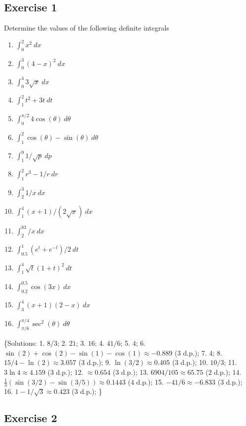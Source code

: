 \documentclass[
  11pt,
  oneside]{book}
\providecommand{\tightlist}{%
  \setlength{\itemsep}{0pt}\setlength{\parskip}{0pt}}
\newcommand{\slide}{}
\theoremstyle{definition}
\theoremstyle{definition}
\theoremstyle{definition}
\theoremstyle{definition}
\theoremstyle{remark}
\begin{document}
\subsection*{Exercise 1}\label{exercise-1-6}

Determine the values of the following definite integrals

\begin{enumerate}
\def\labelenumi{\arabic{enumi}.}
\tightlist
\item
  \(\int_0^2 x^2\ dx\)
\item
  \(\int_0^3 (4-x)^2\ dx\)
\item
  \(\int_0^4 3\sqrt{x}\ dx\)
\item
  \(\int_1^2 t^2+3t\ dt\)
\item
  \(\int_0^{\pi/2}4\cos(\theta) \ d\theta\)
\item
  \(\int_1^2 \cos(\theta)-\sin(\theta)\ d\theta\)
\item
  \(\int_1^9 1/\sqrt{p}\ dp\)
\item
  \(\int_1^2 r^3-1/r\ dr\)
\item
  \(\int_2^3 1/x\ dx\)
\item
  \(\int_1^4 (x+1)/(2\sqrt{x})\ dx\)
\item
  \(\int_2^83/x \ dx\)
\item
  \(\int_{0.5}^1(e^t+e^{-t})/2 \ dt\)
\item
  \(\int_1^4 \sqrt{t}(1+t)^2 \ dt\)
\item
  \(\int_{0.2}^{0.5} \cos(3x)\ dx\)
\item
  \(\int_3^4 (x+1)(2-x)\ dx\)
\item
  \(\int_{\pi/6}^{\pi/4} \sec^2(\theta)\ d\theta\)
\end{enumerate}

\{Solutions:
1. \(8/3\);
2. \(21\);
3. \(16\);
4. \(41/6\);
5. \(4\);
6. \(\sin(2)+\cos(2)-\sin(1)-\cos(1) \approx -0.889\) (\(3\) d.p.);
7. \(4\);
8. \(15/4 - \ln(2) \approx 3.057\) (\(3\) d.p.);
9. \(\ln(3/2) \approx 0.405\) (\(3\) d.p.);
10. \(10/3\);
11. \(3\ln4 \approx 4.159\) (\(3\) d.p.);
12. \(\approx 0.654\) (\(3\) d.p.);
13. \(6904/105 \approx 65.75\) (\(2\) d.p.);
14. \(\frac{1}{3}(\sin(3/2)-\sin(3/5)) \approx 0.1443\) (\(4\) d.p.);
15. \(-41/6 \approx -6.833\) (\(3\) d.p.);
16. \(1-1/\sqrt{3} \approx 0.423\) (\(3\) d.p.);
\}

\slide

\subsection*{Exercise 2}\label{exercise-2-6}
\end{document}
